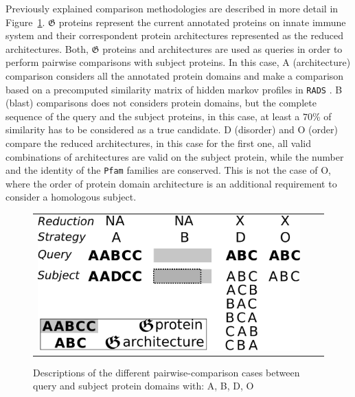 \documentclass[11pt]{article}
\newcommand{\TODO}[1]{\begingroup\color{red}#1\endgroup}
\begin{document}
Previously explained comparison methodologies are described in more detail in
Figure~\ref{fig:ABDO}. $\boldsymbol{\mathfrak{G}}$ proteins represent the
current annotated proteins on innate immune system and their correspondent
protein architectures represented as the reduced architectures.
Both, $\boldsymbol{\mathfrak{G}}$ proteins and architectures are used as queries 
in order to perform pairwise comparisons with subject proteins. In this case, 
A (architecture) comparison considers all the annotated protein domains and make a 
comparison based on a precomputed similarity matrix of \TODO{hidden markov profiles} 
in \texttt{RADS} \cite{Terrapon:2014}. B (blast) comparisons does not considers protein 
domains, but the complete sequence of the query and the subject proteins, in this case, 
at least a $70$\% of similarity has to be considered as a true candidate. D (disorder) 
and O (order) compare the reduced architectures, in this case for the first one, 
all valid combinations of architectures are valid on the subject protein, while the 
number and the identity of the \texttt{Pfam} families are conserved. This is not the case 
of O, where the order of protein domain architecture is an additional requirement to 
consider a homologous subject. 

\begin{figure}
  \begin{tabular}{lcr}
    \begin{minipage}{0.55\textwidth}
    \centering
    \includegraphics[scale=0.4]{figures/ABDO}
    \end{minipage}
    & \qquad &
    \begin{minipage}{0.35\textwidth}
      \caption{Descriptions of the different pairwise-comparison cases between
      query and subject protein domains with: A, B, D, O}\label{fig:ABDO}
    \end{minipage}
  \end{tabular}
\end{figure}
\end{document}
